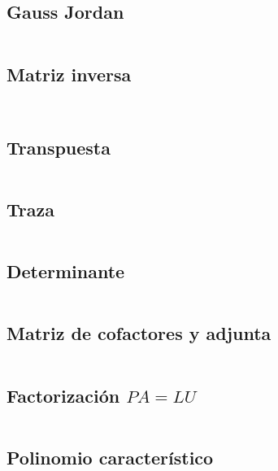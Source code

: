 \documentclass[11pt]{article}
\begin{document}
		\subsection{Gauss Jordan}
		\inputminted[tabsize=2,breaklines,firstline=35,lastline=73,fontsize=\small]{c++}{matrix.cpp}
		
		\subsection{Matriz inversa}
		\inputminted[tabsize=2,breaklines,firstline=80,lastline=86,fontsize=\small]{c++}{matrix.cpp}
		\inputminted[tabsize=2,breaklines,firstline=260,lastline=281,fontsize=\small]{c++}{matrix.cpp}
		
		\subsection{Transpuesta}
		\inputminted[tabsize=2,breaklines,firstline=250,lastline=258,fontsize=\small]{c++}{matrix.cpp}
		
		\subsection{Traza}
		\inputminted[tabsize=2,breaklines,firstline=283,lastline=289,fontsize=\small]{c++}{matrix.cpp}
		
		\subsection{Determinante}
		\inputminted[tabsize=2,breaklines,firstline=291,lastline=307,fontsize=\small]{c++}{matrix.cpp}
		
		\subsection{Matriz de cofactores y adjunta}
		\inputminted[tabsize=2,breaklines,firstline=341,lastline=376,fontsize=\small]{c++}{matrix.cpp}
		
		\subsection{Factorización $PA=LU$}
		\inputminted[tabsize=2,breaklines,firstline=378,lastline=394,fontsize=\small]{c++}{matrix.cpp}
		
		\subsection{Polinomio característico}
		\inputminted[tabsize=2,breaklines,firstline=396,lastline=406,fontsize=\small]{c++}{matrix.cpp}
		
\end{document}
